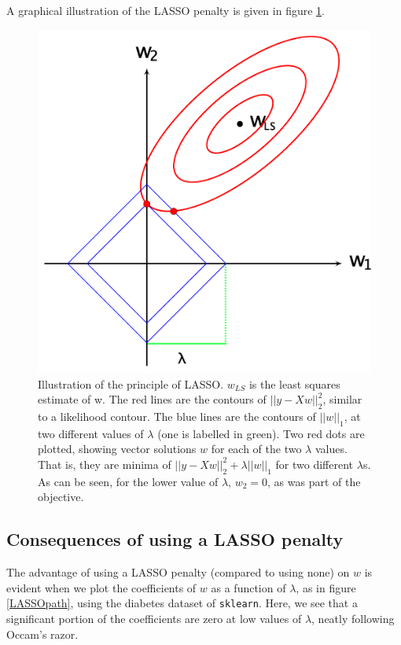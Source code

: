 \documentclass[%
 reprint,
 amsmath,amssymb,
 aps,
]{revtex4-1}
\begin{document}
A graphical illustration of the LASSO penalty is given in figure \ref{LASSOexplained}.

\begin{figure}
  \includegraphics[width=\linewidth]{../figs/ill_LASSO}
  \caption{Illustration of the principle of LASSO.
  $w_{LS}$ is the least squares estimate of w.
  The red lines are the contours of $\lvert\lvert y - Xw \rvert\rvert_2^2$, similar to a likelihood contour.
  The blue lines are the contours of $\lvert\lvert w \rvert\rvert_1$, at two different values of $\lambda$ (one is labelled in green).
  Two red dots are plotted, showing vector solutions $w$ for each of the two $\lambda$ values.
  That is, they are minima of $\lvert\lvert y - Xw \rvert\rvert^2_2 + \lambda \lvert\lvert w \rvert\rvert_1$ for two different $\lambda$s.
  As can be seen, for the lower value of $\lambda$, $w_2 = 0$, as was part of the objective.
  }
  \label{LASSOexplained}
\end{figure}



\subsection{Consequences of using a LASSO penalty}
The advantage of using a LASSO penalty (compared to using none) on $w$ is evident when we plot the coefficients of $w$ as a function of $\lambda$, as in figure \ref{LASSOpath}, using the diabetes dataset of \texttt{sklearn}. \cite{pedregosa_scikit-learn:_2011}
Here, we see that a significant portion of the coefficients are zero at low values of $\lambda$, neatly following Occam's razor. \cite{tibshirani_regression_1996}
\end{document}
